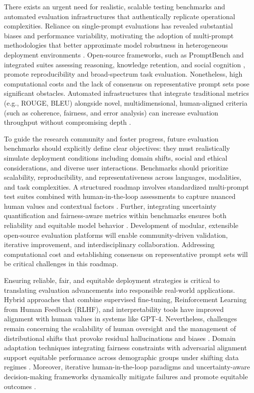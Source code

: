 \documentclass[sigconf]{acmart}
\begin{document}
There exists an urgent need for realistic, scalable testing benchmarks and automated evaluation infrastructures that authentically replicate operational complexities. Reliance on single-prompt evaluations has revealed substantial biases and performance variability, motivating the adoption of multi-prompt methodologies that better approximate model robustness in heterogeneous deployment environments \cite{ref25}. Open-source frameworks, such as PromptBench \cite{ref11} and integrated suites assessing reasoning, knowledge retention, and social cognition \cite{ref17,ref21}, promote reproducibility and broad-spectrum task evaluation. Nonetheless, high computational costs and the lack of consensus on representative prompt sets pose significant obstacles. Automated infrastructures that integrate traditional metrics (e.g., ROUGE, BLEU) alongside novel, multidimensional, human-aligned criteria (such as coherence, fairness, and error analysis) can increase evaluation throughput without compromising depth \cite{ref31,ref39}.

To guide the research community and foster progress, future evaluation benchmarks should explicitly define clear objectives: they must realistically simulate deployment conditions including domain shifts, social and ethical considerations, and diverse user interactions. Benchmarks should prioritize scalability, reproducibility, and representativeness across languages, modalities, and task complexities. A structured roadmap involves standardized multi-prompt test suites combined with human-in-the-loop assessments to capture nuanced human values and contextual factors \cite{ref11,ref20,ref21}. Further, integrating uncertainty quantification and fairness-aware metrics within benchmarks ensures both reliability and equitable model behavior \cite{ref35,ref41}. Development of modular, extensible open-source evaluation platforms will enable community-driven validation, iterative improvement, and interdisciplinary collaboration. Addressing computational cost and establishing consensus on representative prompt sets will be critical challenges in this roadmap.

Ensuring reliable, fair, and equitable deployment strategies is critical to translating evaluation advancements into responsible real-world applications. Hybrid approaches that combine supervised fine-tuning, Reinforcement Learning from Human Feedback (RLHF), and interpretability tools have improved alignment with human values in systems like GPT-4. Nevertheless, challenges remain concerning the scalability of human oversight and the management of distributional shifts that provoke residual hallucinations and biases \cite{ref20}. Domain adaptation techniques integrating fairness constraints with adversarial alignment support equitable performance across demographic groups under shifting data regimes \cite{ref41}. Moreover, iterative human-in-the-loop paradigms and uncertainty-aware decision-making frameworks dynamically mitigate failures and promote equitable outcomes \cite{ref31,ref35}.
\end{document}
